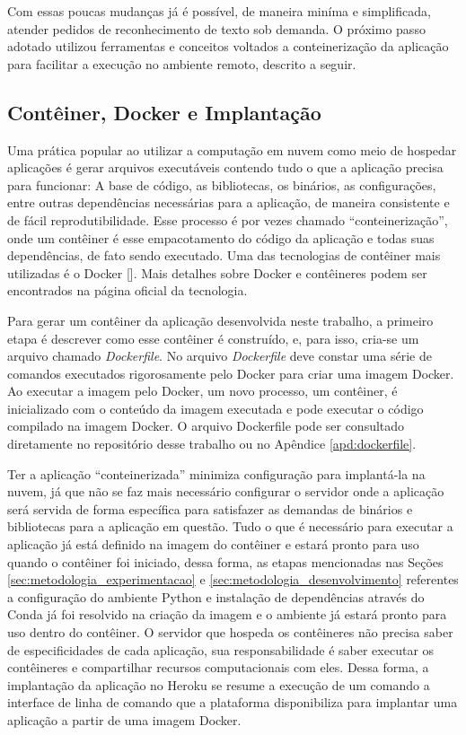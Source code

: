 Com essas poucas mudanças já é possível, de maneira miníma e simplificada, atender pedidos de reconhecimento de texto sob demanda. O próximo 
passo adotado utilizou ferramentas e conceitos voltados a conteinerização da aplicação para facilitar a execução no ambiente remoto, descrito a seguir.

\subsection{Contêiner, Docker e Implantação}
Uma prática popular ao utilizar a computação em nuvem como meio de hospedar aplicações é gerar arquivos executáveis contendo tudo o que a aplicação 
precisa para funcionar: A base de código, as bibliotecas, os binários, as configurações, entre outras dependências necessárias para a aplicação, de maneira consistente e de 
fácil reprodutibilidade. Esse processo é por vezes chamado “conteinerização”, onde um contêiner é esse empacotamento do código da aplicação e todas suas dependências, 
de fato sendo executado. Uma das tecnologias de contêiner mais utilizadas é o Docker []. Mais detalhes sobre Docker e contêineres podem 
ser encontrados na página oficial da tecnologia.

Para gerar um contêiner da aplicação desenvolvida neste trabalho, a primeiro etapa é descrever como esse contêiner é construído, e, para isso, 
cria-se um arquivo chamado \textit{Dockerfile}. No arquivo \textit{Dockerfile} deve constar uma série de comandos executados rigorosamente pelo Docker 
para criar uma imagem Docker. Ao executar a imagem pelo Docker, um novo processo, um contêiner, é inicializado com o conteúdo da imagem executada e 
pode executar o código compilado na imagem Docker. O arquivo Dockerfile pode ser consultado diretamente no repositório desse trabalho ou no 
Apêndice \ref{apd:dockerfile}.

Ter a aplicação “conteinerizada” minimiza configuração para implantá-la na nuvem, já que não se faz mais necessário configurar o servidor 
onde a aplicação será servida de forma específica para satisfazer as demandas de binários e bibliotecas para a aplicação em questão. Tudo o que é 
necessário para executar a aplicação já está definido na imagem do contêiner e estará pronto para uso quando o contêiner foi iniciado, dessa forma, 
as etapas mencionadas nas Seções \ref{sec:metodologia_experimentacao} e \ref{sec:metodologia_desenvolvimento} referentes a configuração do ambiente 
Python e instalação de dependências através do Conda já foi resolvido na criação da imagem e o ambiente já estará pronto para uso dentro do contêiner. 
O servidor que hospeda os contêineres não precisa saber de especificidades de cada aplicação, sua responsabilidade é saber executar os contêineres e 
compartilhar recursos computacionais com eles. Dessa forma, a implantação da aplicação no Heroku se resume a execução de um comando a interface de linha 
de comando que a plataforma disponibiliza para implantar uma aplicação a partir de uma imagem Docker.

